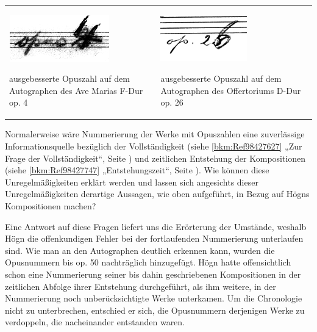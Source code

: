 \begin{center}
\begin{minipage}{9.241cm}
\begin{center}
\tablefirsthead{}
\tablehead{}
\tabletail{}
\tablelasttail{}
\begin{supertabular}{m{4.5470004cm}m{4.294cm}}

\includegraphics[width=4.364cm,height=2.007cm]{pictures/zulassungsarbeit-img060.png}

ausgebesserte Opuszahl auf dem
Autographen des Ave Marias F-Dur op. 4 &

\includegraphics[width=3.739cm,height=2cm]{pictures/zulassungsarbeit-img061.png}

ausgebesserte Opuszahl auf dem
Autographen des Offertoriums D-Dur op. 26\\
\end{supertabular}
\end{center}
\end{minipage}
\end{center}
Normalerweise wäre Nummerierung der Werke mit Opuszahlen eine
zuverlässige Informationsquelle bezüglich der Vollständigkeit (siehe
\ref{bkm:Ref98427627} „Zur Frage der Vollständigkeit“, Seite
\pageref{bkm:Ref98427627}) und zeitlichen Entstehung der Kompositionen
(siehe \ref{bkm:Ref98427747} „Entstehungszeit“, Seite
\pageref{bkm:Ref98427747}). Wie können diese Unregelmäßigkeiten erklärt
werden und lassen sich angesichts dieser Unregelmäßigkeiten derartige
Aussagen, wie oben aufgeführt, in Bezug auf Högns Kompositionen machen?

Eine Antwort auf diese Fragen liefert uns die Erörterung der Umstände,
weshalb Högn die offenkundigen Fehler bei der fortlaufenden
Nummerierung unterlaufen sind. Wie man an den Autographen deutlich
erkennen kann, wurden die Opusnummern bis op. 50 nachträglich
hinzugefügt. Högn hatte offensichtlich schon eine Nummerierung seiner
bis dahin geschriebenen Kompositionen in der zeitlichen Abfolge ihrer
Entstehung durchgeführt, als ihm weitere, in der Nummerierung noch
unberücksichtigte Werke unterkamen. Um die Chronologie nicht zu
unterbrechen, entschied er sich, die Opusnummern derjenigen Werke zu
verdoppeln, die nacheinander entstanden waren.

